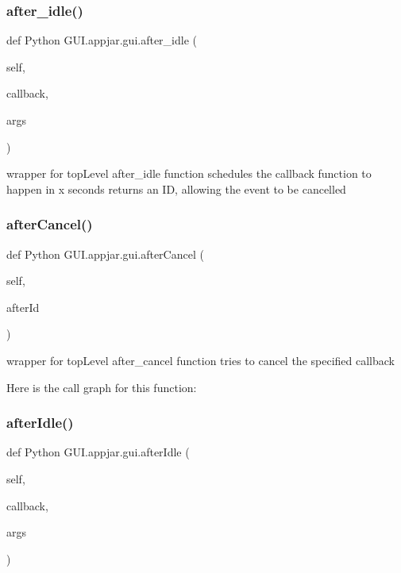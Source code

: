 \subsubsection{\texorpdfstring{after\+\_\+idle()}{after\_idle()}}
{\footnotesize\ttfamily def Python G\+U\+I.\+appjar.\+gui.\+after\+\_\+idle (\begin{DoxyParamCaption}\item[{}]{self,  }\item[{}]{callback,  }\item[{}]{args }\end{DoxyParamCaption})}

\begin{DoxyVerb}wrapper for topLevel after_idle function
    schedules the callback function to happen in x seconds
    returns an ID, allowing the event to be cancelled \end{DoxyVerb}
 \mbox{\label{class_python_01_g_u_i_1_1appjar_1_1gui_a714ba2f2038b43891963126d59a493dc}} 
\subsubsection{\texorpdfstring{after\+Cancel()}{afterCancel()}}
{\footnotesize\ttfamily def Python G\+U\+I.\+appjar.\+gui.\+after\+Cancel (\begin{DoxyParamCaption}\item[{}]{self,  }\item[{}]{after\+Id }\end{DoxyParamCaption})}

\begin{DoxyVerb}wrapper for topLevel after_cancel function
    tries to cancel the specified callback \end{DoxyVerb}
 Here is the call graph for this function\+:
\mbox{\label{class_python_01_g_u_i_1_1appjar_1_1gui_a055131e89a6aebf80b238aecea8f4cc6}} 
\subsubsection{\texorpdfstring{after\+Idle()}{afterIdle()}}
{\footnotesize\ttfamily def Python G\+U\+I.\+appjar.\+gui.\+after\+Idle (\begin{DoxyParamCaption}\item[{}]{self,  }\item[{}]{callback,  }\item[{}]{args }\end{DoxyParamCaption})}

